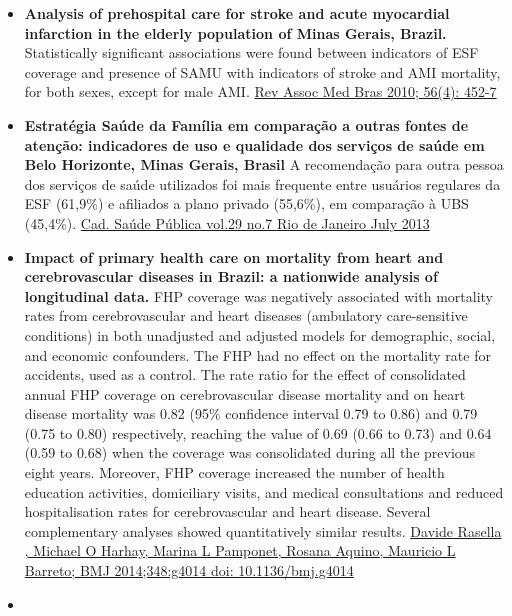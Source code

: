 \documentclass[]{book}
\begin{document}
\begin{itemize}
\item
  \textbf{Analysis of prehospital care for stroke and acute myocardial infarction in the elderly population of Minas Gerais, Brazil.} Statistically significant associations were found between indicators of ESF coverage and presence of SAMU with indicators of stroke and AMI mortality, for both sexes, except for male AMI. \href{http://www.scielo.br/pdf/ramb/v56n4/en_19.pdf}{Rev Assoc Med Bras 2010; 56(4): 452-7}
\item
  \textbf{Estratégia Saúde da Família em comparação a outras fontes de atenção: indicadores de uso e qualidade dos serviços de saúde em Belo Horizonte, Minas Gerais, Brasil} A recomendação para outra pessoa dos serviços de saúde utilizados foi mais frequente entre usuários regulares da ESF (61,9\%) e afiliados a plano privado (55,6\%), em comparação à UBS (45,4\%). \href{http://www.scielo.br/scielo.php?script=sci_arttext\&pid=S0102-311X2013000700011\&lng=en\&nrm=iso\&tlng=en}{Cad. Saúde Pública vol.29 no.7 Rio de Janeiro July 2013}
\item
  \textbf{Impact of primary health care on mortality from heart and cerebrovascular diseases in Brazil: a nationwide analysis of longitudinal data.} FHP coverage was negatively associated with mortality rates from cerebrovascular and heart diseases (ambulatory care-sensitive conditions) in both unadjusted and adjusted models for demographic, social, and economic confounders. The FHP had no effect on the mortality rate for accidents, used as a control. The rate ratio for the effect of consolidated annual FHP coverage on cerebrovascular disease mortality and on heart disease mortality was 0.82 (95\% confidence interval 0.79 to 0.86) and 0.79 (0.75 to 0.80) respectively, reaching the value of 0.69 (0.66 to 0.73) and 0.64 (0.59 to 0.68) when the coverage was consolidated during all the previous eight years. Moreover, FHP coverage increased the number of health education activities, domiciliary visits, and medical consultations and reduced hospitalisation rates for cerebrovascular and heart disease. Several complementary analyses showed quantitatively similar results. \href{https://www.bmj.com/content/bmj/349/bmj.g4014.full.pdf}{Davide Rasella , Michael O Harhay, Marina L Pamponet, Rosana Aquino, Mauricio L Barreto; BMJ 2014;348:g4014 doi: 10.1136/bmj.g4014}
\item

\end{itemize}
\end{document}
